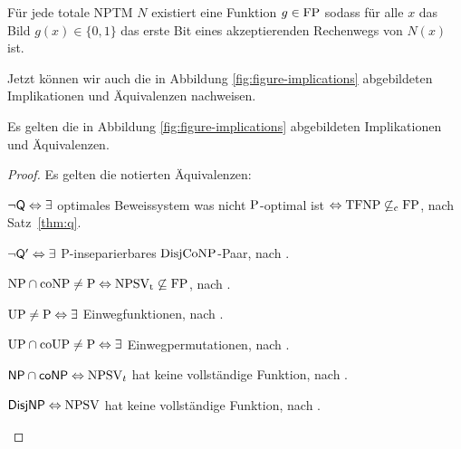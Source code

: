\begin{conjecture}
    Für jede totale NPTM $N$ existiert eine Funktion $g\in\FP$ sodass für alle $x$ das Bild $g(x)\in\{0,1\}$ das erste Bit eines akzeptierenden Rechenwegs von $N(x)$ ist. 
\end{conjecture}

Jetzt können wir auch die in Abbildung \ref{fig:figure-implications} abgebildeten Implikationen und Äquivalenzen nachweisen.
\begin{theorem}\label{thm:figure-implications}
    Es gelten die in Abbildung \ref{fig:figure-implications} abgebildeten Implikationen und Äquivalenzen.
\end{theorem}
\begin{proof}
    Es gelten die notierten Äquivalenzen:
    \begin{Prooflist}[nosep,midpenalty=0,label={\arabic*.},labelsep=3pt]
    \item $\neg\hQ \Leftrightarrow \exists$ optimales Beweissystem was nicht $\P$-optimal ist $\Leftrightarrow \TFNP\not\subseteq_\mathrm{c} \FP$, nach Satz~\ref{thm:q}.
    \item $\neg\hQ' \Leftrightarrow\exists$ P-inseparierbares $\DisjCoNP$-Paar, nach \textcite[Lemma~2.12, vgl. Appendix]{fortnow_separability_1993}.
    \item $\NP\cap\coNP\neq\P \Leftrightarrow \NPSVt\not\subseteq\FP$, nach \textcite[Prop.~1]{fenner_inverting_2003}.
    \item $\UP\neq\P \Leftrightarrow\exists$ Einwegfunktionen, nach \textcite[Thm.~10]{grollmann_complexity_1988}.
    \item $\UP\cap\coUP\neq\P \Leftrightarrow\exists$ Einwegpermutationen, nach \textcite{homan_one-way_2003}.
    \item $\hNPcoNP \Leftrightarrow \NPSV_t$ hat keine vollständige Funktion, nach \textcite[Prop.~3]{beyersdorff_nondeterministic_2009}.
    \item $\hDisjNP \Leftrightarrow \NPSV$ hat keine vollständige Funktion, nach \textcite[Thm.~9]{glaser_reductions_2005}.
    \end{Prooflist}


\end{proof}
